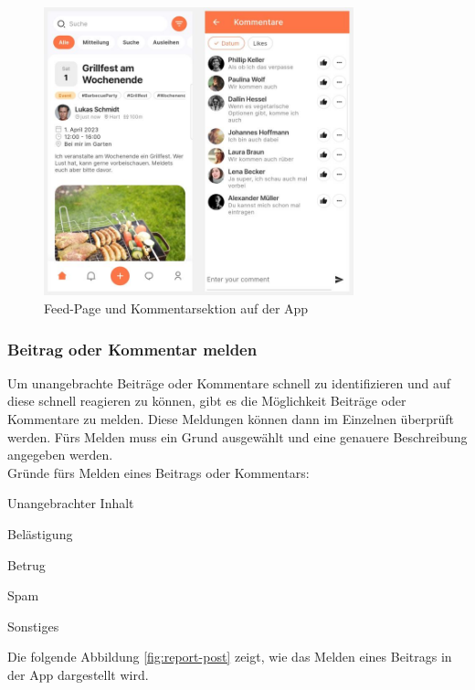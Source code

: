 \begin{figure}[H]
  \centering
  \includegraphics[width=0.8\textwidth]{pics/feed-and-comment-section.JPG}
  \caption{Feed-Page und Kommentarsektion auf der App}
  \label{fig:feed-comment}
\end{figure}

\subsubsection{Beitrag oder Kommentar melden}
Um unangebrachte Beiträge oder Kommentare schnell zu identifizieren und auf diese schnell reagieren zu können, gibt es die Möglichkeit Beiträge oder Kommentare zu melden. Diese Meldungen können dann im Einzelnen überprüft werden. Fürs Melden muss ein Grund ausgewählt und eine genauere Beschreibung angegeben werden.
\\
Gründe fürs Melden eines Beitrags oder Kommentars:

\begin{compactitem}
  \item Unangebrachter Inhalt
  \item Belästigung
  \item Betrug
  \item Spam
  \item Sonstiges
\end{compactitem}

Die folgende Abbildung \ref{fig:report-post} zeigt, wie das Melden eines Beitrags in der App dargestellt wird.

